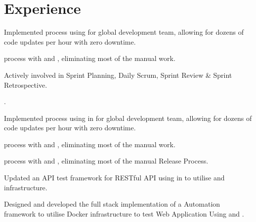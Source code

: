 \documentclass[]{openfont}
\begin{document}
\hfill
\begin{minipage}[t]{0.66\textwidth} 


\section{Experience}

\vspace{\topsep} %
\begin{tightemize}
\item Implemented  process using  for global development team, allowing for dozens of code updates per hour with zero downtime.
\item {} process with  and , eliminating most of the manual work.
\item Actively involved in Sprint Planning, Daily Scrum, Sprint Review \& Sprint Retrospective.
\item {}.
\end{tightemize}
\sectionsep

\vspace{\topsep} %
\begin{tightemize}
\item Implemented  process using  in  for global development team, allowing for dozens of code updates per hour with zero downtime.
\item {} process with  and , eliminating most of the manual work.
\item {} process with  and , eliminating most of the manual Release Process.
\item Updated an API test framework for RESTful API using  in  to utilise  and  infrastructure.
\item Designed and developed the full stack implementation of a Automation framework to utilise Docker infrastructure to test Web Application Using  and .
\end{tightemize}
\sectionsep


\end{minipage}
\end{document}
